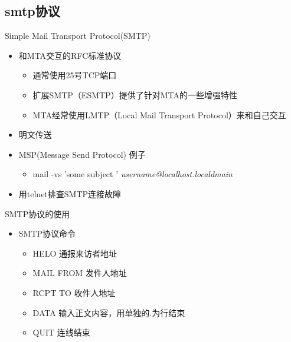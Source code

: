 \subsection{smtp协议}


\begin{frame}{Simple Mail Transport Protocol(SMTP)}
\begin{itemize}
\item 和MTA交互的RFC标准协议

\begin{itemize}
\item 通常使用25号TCP端口
\item 扩展SMTP（ESMTP）提供了针对MTA的一些增强特性
\item MTA经常使用LMTP（Local Mail Transport Protocol）来和自己交互
\end{itemize}
\item 明文传送
\item MSP(Message Send Protocol) 例子

\begin{itemize}
\item mail -vs 'some subject ' \emph{username@localhost.localdmain}
\end{itemize}
\item 用telnet排查SMTP连接故障
\end{itemize}

\end{frame} 
\begin{frame}{SMTP协议的使用}
\begin{itemize}
\item SMTP协议命令

\begin{itemize}
\item HELO 通报来访者地址
\item MAIL FROM 发件人地址
\item RCPT TO 收件人地址
\item DATA 输入正文内容，用单独的.为行结束
\item QUIT 连线结束
\end{itemize}
\end{itemize}

\end{frame} 
